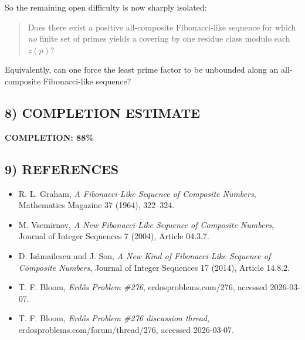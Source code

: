 So the remaining open difficulty is now sharply isolated:
\begin{quote}
Does there exist a positive all-composite Fibonacci-like sequence for which \emph{no} finite set of primes yields a covering by one residue class modulo each $z(p)$?
\end{quote}
Equivalently, can one force the least prime factor to be unbounded along an all-composite Fibonacci-like sequence?

\subsection*{8) COMPLETION ESTIMATE}
\textbf{COMPLETION: 88\%}

\subsection*{9) REFERENCES}
\begin{itemize}
\item R. L. Graham, \emph{A Fibonacci-Like Sequence of Composite Numbers}, Mathematics Magazine 37 (1964), 322--324.
\item M. Vsemirnov, \emph{A New Fibonacci-Like Sequence of Composite Numbers}, Journal of Integer Sequences 7 (2004), Article 04.3.7.
\item D. Is\u{a}mailescu and J. Son, \emph{A New Kind of Fibonacci-Like Sequence of Composite Numbers}, Journal of Integer Sequences 17 (2014), Article 14.8.2.
\item T. F. Bloom, \emph{Erd\H{o}s Problem \#276}, erdosproblems.com/276, accessed 2026-03-07.
\item T. F. Bloom, \emph{Erd\H{o}s Problem \#276 discussion thread}, erdosproblems.com/forum/thread/276, accessed 2026-03-07.
\end{itemize}
